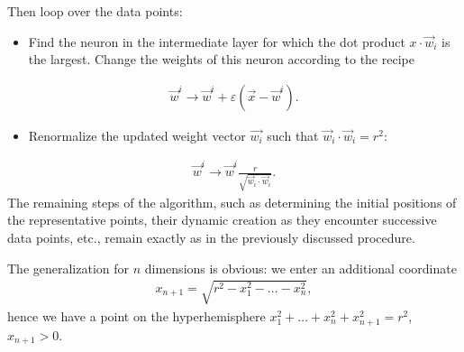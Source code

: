 \documentclass[a4paper,12pt,polish]{jupyterBook}
\begin{document}
\sphinxAtStartPar
Then loop over the data points:
\begin{itemize}
\item {} 
\sphinxAtStartPar
Find the neuron in the intermediate layer for which the dot product \( x \cdot \vec {w} _i \) is the largest. Change the weights of this neuron according to the recipe

\end{itemize}
\begin{equation*}
\begin{split} \vec {w} ^ i \to \vec {w} ^ i + \varepsilon (\vec {x} - \vec {w} ^ i). \end{split}
\end{equation*}\begin{itemize}
\item {} 
\sphinxAtStartPar
Renormalize the updated weight vector \( \vec {w_i} \) such that \( \vec {w} _i \cdot \vec {w} _i = r ^ 2 \):

\end{itemize}
\begin{equation*}
\begin{split} \vec {w} ^ i \to \vec {w} ^ i \frac {r} {\sqrt {\vec {w} _i \cdot \vec {w} _i}}. \end{split}
\end{equation*}
\sphinxAtStartPar
The remaining steps of the algorithm, such as determining the initial positions of the representative points, their dynamic creation as they encounter successive data points, etc., remain exactly as in the previously discussed procedure.

\sphinxAtStartPar
The generalization for \( n \) dimensions is obvious: we enter an additional coordinate
\begin{equation*}
\begin{split} x_ {n + 1} = \sqrt {r ^ 2 - x_1 ^ 2 -...- x_n ^ 2},\end{split}
\end{equation*}
\sphinxAtStartPar
hence we have a point on the hyper\sphinxhyphen{}hemisphere \( x_1 ^ 2 + \dots + x_n ^ 2 + x_ {n + 1} ^ 2 = r ^ 2 \),  \(x_ {n + 1} >0\).
\end{document}
